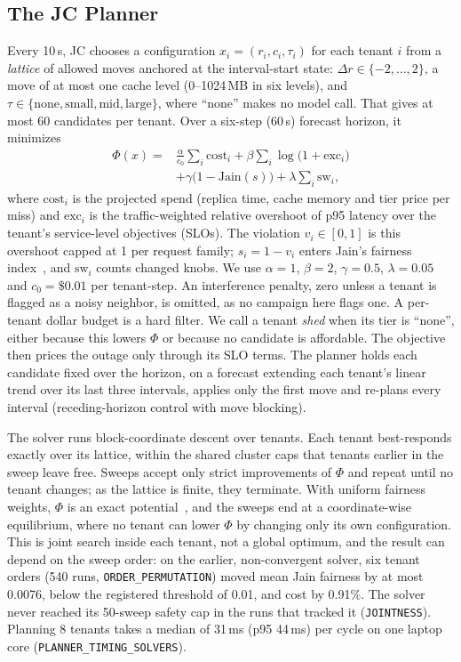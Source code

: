 \documentclass[conference,a4paper]{IEEEtran}
\newcommand{\jcac}{JC}
\newcommand{\jcac}{JCAC}
\newcommand{\rec}[1]{\texttt{\small #1}}
\begin{document}
\subsection{The \jcac{} Planner}
\label{sec:jcac}

Every 10\,s, \jcac{} chooses a configuration $x_i=(r_i,c_i,\tau_i)$
for each tenant $i$ from a \emph{lattice} of allowed moves anchored at
the interval-start state: $\Delta r\in\{-2,\dots,2\}$, a move
of at most one cache level (0--1024\,MB in six levels), and
$\tau\in\{\text{none},\text{small},\text{mid},\text{large}\}$, where
``none'' makes no model call. That gives at most 60 candidates per tenant.
Over a six-step (60\,s) forecast horizon, it minimizes
\begin{equation}
\label{eq:plan}
\begin{split}
\Phi(x)={}&\frac{\alpha}{c_0}\sum_i \mathrm{cost}_i
 +\beta\sum_i\log\bigl(1+\mathrm{exc}_i\bigr)\\
  &+\gamma\bigl(1-\mathrm{Jain}(s)\bigr)
 +\lambda\sum_i \mathrm{sw}_i ,
\end{split}
\end{equation}
where $\mathrm{cost}_i$ is the projected spend (replica time, cache memory
and tier price per miss) and $\mathrm{exc}_i$ is the traffic-weighted
relative overshoot of p95 latency over the tenant's service-level
objectives (SLOs). The violation $v_i\in[0,1]$ is this overshoot capped at
1 per request family; $s_i=1-v_i$ enters Jain's fairness
index~\cite{jain1984}, and $\mathrm{sw}_i$ counts changed knobs. We use
$\alpha=1$, $\beta=2$, $\gamma=0.5$, $\lambda=0.05$ and $c_0=\$0.01$ per
tenant-step. An interference penalty, zero unless a tenant is flagged as a
noisy neighbor, is omitted, as no campaign here flags one. A per-tenant
dollar budget is a hard filter. We call a tenant \emph{shed} when its tier
is ``none'', either because this lowers $\Phi$ or because no candidate is
affordable. The objective then prices the outage only through its SLO terms.
The planner holds each candidate fixed over the horizon, on a forecast
extending each tenant's linear trend over its last three intervals, applies
only the first move and re-plans every interval (receding-horizon control
with move blocking).

The solver runs block-coordinate descent
over tenants. Each tenant best-responds exactly over its lattice, within the shared
cluster caps that tenants earlier in the sweep leave free. Sweeps accept
only strict improvements of $\Phi$ and repeat until no tenant changes; as
the lattice is finite, they terminate. With uniform fairness weights, $\Phi$
is an exact potential~\cite{monderer1996}, and the sweeps end at a
coordinate-wise equilibrium, where no tenant can lower $\Phi$ by changing
only its own configuration. This is joint search inside each tenant, not a
global optimum, and the result can depend on the sweep order: on the earlier,
non-convergent solver, six tenant orders (540 runs, \rec{ORDER\_PERMUTATION})
moved mean Jain fairness by at most 0.0076, below the registered threshold
of 0.01, and cost by 0.91\%. The solver never reached its 50-sweep safety
cap in the runs that tracked it (\rec{JOINTNESS}).
Planning 8 tenants takes a median of 31\,ms (p95 44\,ms) per cycle on one
laptop core (\rec{PLANNER\_TIMING\_SOLVERS}).
\end{document}
